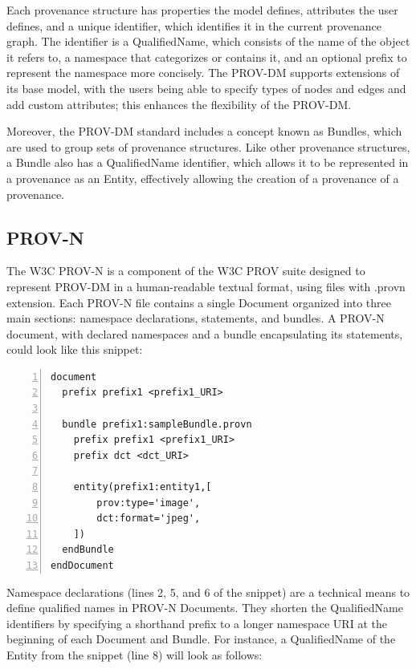 \documentclass[
  digital,     %
  oneside,     %
  nosansbold,  %
  nocolorbold, %
  lof,         %
  lot,         %
]{fithesis4}
\begin{document}
Each provenance structure has properties the model defines, attributes the user defines, and a unique identifier, which identifies it in the current provenance graph. The identifier is a QualifiedName, which consists of the name of the object it refers to, a namespace that categorizes or contains it, and an optional prefix to represent the namespace more concisely. The PROV-DM supports extensions of its base model, with the users being able to specify types of nodes and edges and add custom attributes; this enhances the flexibility of the PROV-DM.

Moreover, the PROV-DM standard includes a concept known as Bundles, which are used to group sets of provenance structures. Like other provenance structures, a Bundle also has a QualifiedName identifier, which allows it to be represented in a provenance as an Entity, effectively allowing the creation of a provenance of a provenance.
\shorthandon{-}

\subsection{PROV-N}
\shorthandoff{-}
The W3C PROV-N is a component of the W3C PROV suite designed to represent PROV-DM in a human-readable textual format, using files with .provn extension. Each PROV-N file contains a single Document organized into three main sections: namespace declarations, statements, and bundles. A PROV-N document, with declared namespaces and a bundle encapsulating its statements, could look like this snippet:

\begin{center}
\begin{lstlisting}[numbers=left,
    stepnumber=1,
    tabsize=4,
    breaklines=true,
    breakatwhitespace=false,
    xleftmargin=3.5em
    ]
document
  prefix prefix1 <prefix1_URI>

  bundle prefix1:sampleBundle.provn
    prefix prefix1 <prefix1_URI>
    prefix dct <dct_URI>

    entity(prefix1:entity1,[
        prov:type='image',
        dct:format='jpeg',
    ])
  endBundle
endDocument
\end{lstlisting}
\end{center}

Namespace declarations (lines 2, 5, and 6 of the snippet) are a technical means to define qualified names in PROV-N Documents. They shorten the QualifiedName identifiers by specifying a shorthand prefix to a longer namespace URI at the beginning of each Document and Bundle. For instance, a QualifiedName of the Entity from the snippet (line 8) will look as follows:
\end{document}
